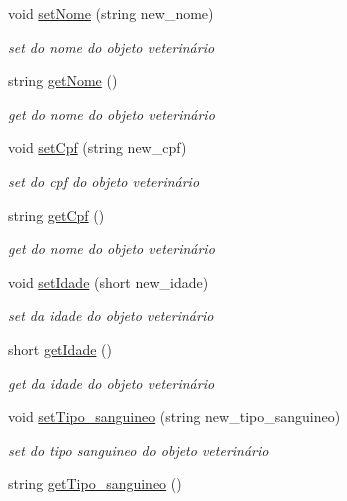 \begin{DoxyCompactItemize}
void \mbox{\hyperlink{class_veterinario_ad024ac2118285e41800b495b6cef7d7b}{set\+Nome}} (string new\+\_\+nome)
\begin{DoxyCompactList}\small\item\em set do nome do objeto veterinário \end{DoxyCompactList}\item 
string \mbox{\hyperlink{class_veterinario_a011c6730cdfe40c9d027e653ac8f42bb}{get\+Nome}} ()
\begin{DoxyCompactList}\small\item\em get do nome do objeto veterinário \end{DoxyCompactList}\item 
void \mbox{\hyperlink{class_veterinario_afd3e8ad81bb5e4974898e3cfdd333edf}{set\+Cpf}} (string new\+\_\+cpf)
\begin{DoxyCompactList}\small\item\em set do cpf do objeto veterinário \end{DoxyCompactList}\item 
string \mbox{\hyperlink{class_veterinario_af08ba2464f20c2ba51f3415f62777583}{get\+Cpf}} ()
\begin{DoxyCompactList}\small\item\em get do nome do objeto veterinário \end{DoxyCompactList}\item 
void \mbox{\hyperlink{class_veterinario_ad8e5d38ff8cc23c0c13cc511c9d558c6}{set\+Idade}} (short new\+\_\+idade)
\begin{DoxyCompactList}\small\item\em set da idade do objeto veterinário \end{DoxyCompactList}\item 
short \mbox{\hyperlink{class_veterinario_a672249669ce0b988c2ac827d28a73fb8}{get\+Idade}} ()
\begin{DoxyCompactList}\small\item\em get da idade do objeto veterinário \end{DoxyCompactList}\item 
void \mbox{\hyperlink{class_veterinario_a48a7f01fb9ccb2bff9c1c51f5fb55daf}{set\+Tipo\+\_\+sanguineo}} (string new\+\_\+tipo\+\_\+sanguineo)
\begin{DoxyCompactList}\small\item\em set do tipo sanguineo do objeto veterinário \end{DoxyCompactList}\item 
string \mbox{\hyperlink{class_veterinario_a247caf0dd80c72c5c1b30cc0cb324763}{get\+Tipo\+\_\+sanguineo}} ()

\end{DoxyCompactItemize}
